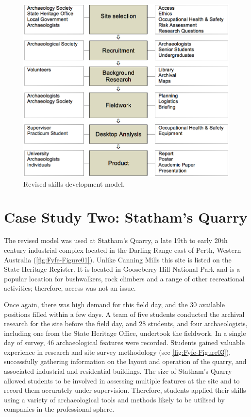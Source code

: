 \documentclass{ijsra}
\begin{document}
   	\begin{figure} %
   		\includegraphics[width=\linewidth]{figures/Fyfe-Figure02}
   		\caption{Revised skills development model.}
   		\centering
   		\label{fig:Fyfe-Figure02}
   	\end{figure}

\section{Case Study Two: Statham's Quarry}

The revised model was used at Statham’s Quarry, a late 19th to early 20th century industrial complex located in the Darling Range east of Perth, Western Australia (\cref{fig:Fyfe-Figure01}). Unlike Canning Mills this site is listed on the State Heritage Register. It is located in Gooseberry Hill National Park and is a popular location for bushwalkers, rock climbers and a range of other recreational activities; therefore, access was not an issue.

Once again, there was high demand for this field day, and the 30 available positions filled within a few days. A team of five students conducted the archival research for the site before the field day, and 28 students, and four archaeologists, including one from the State Heritage Office, undertook the fieldwork. 
In a single day of survey, 46 archaeological features were recorded. 
Students gained valuable experience in research and site survey methodology (see \cref{fig:Fyfe-Figure03}), successfully gathering information on the layout and operation of the quarry, and associated industrial and residential buildings. 
The size of Statham’s Quarry allowed students to be involved in assessing multiple features at the site and to record them accurately under supervision. Therefore, students applied their skills using a variety of archaeological tools and methods likely to be utilised by companies in the professional sphere.
\end{document}

